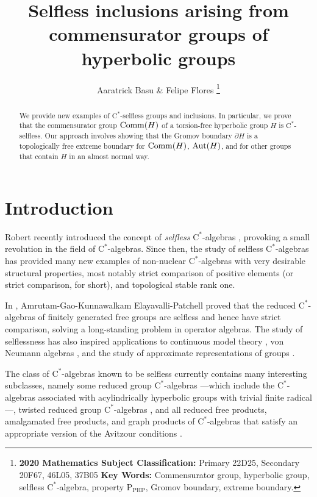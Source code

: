\documentclass[11pt]{article}
\date{}
\theoremstyle{definition}
\theoremstyle{remark}
\numberwithin{equation}{section}
\numberwithin{equation}{section}
\newcommand{\Cs}{\ensuremath{\mathrm{C}^\ast}}
\numberwithin{equation}{section}
\begin{document}
\title{Selfless inclusions arising from commensurator groups of hyperbolic groups}


\author{Aaratrick Basu \& Felipe Flores
\footnote{
\textbf{2020 Mathematics Subject Classification:} Primary 22D25, Secondary 20F67, 46L05, 37B05
\newline
\textbf{Key Words:} Commensurator group, hyperbolic group, selfless \Cs-algebra, property $\mathrm{P}_{\mathrm{PHP}}$, Gromov boundary, extreme boundary.}
}

\maketitle


\begin{abstract}\setlength{\parindent}{0pt}\setlength{\parskip}{1ex}\noindent
We provide new examples of \Cs-selfless groups and inclusions. In particular, we prove that the commensurator group ${\rm Comm}(H)$ of a torsion-free hyperbolic group $H$ is \Cs-selfless. Our approach involves showing that the Gromov boundary $\partial H$ is a topologically free extreme boundary for ${\rm Comm}(H)$, ${\rm Aut}(H)$, and for other groups that contain $H$ in an almost normal way.
\end{abstract}


\section{Introduction}

Robert recently introduced the concept of \emph{selfless} \Cs-algebras \cite{Ro25}, provoking a small revolution in the field of \Cs-algebras. Since then, the study of selfless \Cs-algebras has provided many new examples of non-nuclear \Cs-algebras with very desirable structural properties, most notably strict comparison of positive elements (or strict comparison, for short), and topological stable rank one. 

In \cite{AGKEP25}, Amrutam-Gao-Kunnawalkam Elayavalli-Patchell proved that the reduced \Cs-algebras of finitely generated free groups are selfless and hence have strict comparison, solving a long-standing problem in operator algebras. The study of selflessness has also inspired applications to continuous model theory \cite{KES25}, von Neumann algebras \cite{HoMa26}, and the study of approximate representations of groups \cite{GKEMP26}.

The class of \Cs-algebras known to be selfless currently contains many interesting subclasses, namely some reduced group \Cs-algebras \cite{AGKEP25,Oz25,Vi25,Vi26} —which include the \Cs-algebras associated with acylindrically hyperbolic groups with trivial finite radical—, twisted reduced group \Cs-algebras \cite{RTV25,FKOCP26}, and all reduced free products, amalgamated free products, and graph products of \Cs-algebras that satisfy an appropriate version of the Avitzour conditions \cite{HKER25,FKOCP25,GKEPL26}.
\end{document}
